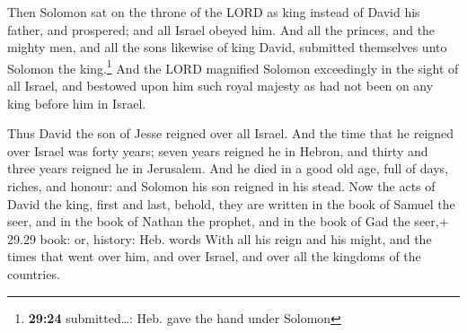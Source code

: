 Then Solomon sat on the throne of the LORD as king
instead of David his father, and prospered; and all Israel obeyed him.
 And all the princes, and the mighty men, and all the
sons likewise of king David, submitted themselves unto Solomon the
king.\footnote{\textbf{29:24} submitted\ldots: Heb. gave the hand under
  Solomon}  And the LORD magnified Solomon exceedingly in
the sight of all Israel, and bestowed upon him such royal majesty as had
not been on any king before him in Israel.

 Thus David the son of Jesse reigned over all Israel.
 And the time that he reigned over Israel was forty
years; seven years reigned he in Hebron, and thirty and three years
reigned he in Jerusalem.  And he died in a good old age,
full of days, riches, and honour: and Solomon his son reigned in his
stead.  Now the acts of David the king, first and last,
behold, they are written in the book of Samuel the seer, and in the book
of Nathan the prophet, and in the book of Gad the seer,+ 29.29 book: or,
history: Heb. words  With all his reign and his might,
and the times that went over him, and over Israel, and over all the
kingdoms of the countries.
